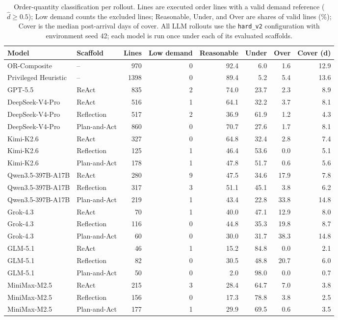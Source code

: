 \begin{table}[t]
\centering
\small
\begin{tabular}{llrrrrrr}
\toprule
Model & Scaffold & Lines & Low demand & Reasonable & Under & Over & Cover (d) \\
\midrule
OR-Composite & -- & 970 & 0 & 92.4 & 6.0 & 1.6 & 12.9 \\
Privileged Heuristic & -- & 1398 & 0 & 89.4 & 5.2 & 5.4 & 13.6 \\
\midrule
GPT-5.5 & ReAct & 835 & 2 & 74.0 & 23.7 & 2.3 & 8.9 \\
DeepSeek-V4-Pro & ReAct & 516 & 1 & 64.1 & 32.2 & 3.7 & 8.1 \\
DeepSeek-V4-Pro & Reflection & 517 & 2 & 36.9 & 61.9 & 1.2 & 4.3 \\
DeepSeek-V4-Pro & Plan-and-Act & 860 & 0 & 70.7 & 27.6 & 1.7 & 8.1 \\
Kimi-K2.6 & ReAct & 327 & 0 & 64.8 & 32.4 & 2.8 & 7.4 \\
Kimi-K2.6 & Reflection & 125 & 1 & 46.4 & 53.6 & 0.0 & 5.1 \\
Kimi-K2.6 & Plan-and-Act & 178 & 1 & 47.8 & 51.7 & 0.6 & 5.6 \\
Qwen3.5-397B-A17B & ReAct & 280 & 9 & 47.5 & 34.6 & 17.9 & 7.8 \\
Qwen3.5-397B-A17B & Reflection & 317 & 3 & 51.1 & 45.1 & 3.8 & 6.2 \\
Qwen3.5-397B-A17B & Plan-and-Act & 219 & 1 & 43.4 & 22.8 & 33.8 & 14.8 \\
Grok-4.3 & ReAct & 70 & 1 & 40.0 & 47.1 & 12.9 & 8.0 \\
Grok-4.3 & Reflection & 116 & 0 & 44.8 & 35.3 & 19.8 & 8.7 \\
Grok-4.3 & Plan-and-Act & 60 & 0 & 30.0 & 31.7 & 38.3 & 14.8 \\
GLM-5.1 & ReAct & 46 & 1 & 15.2 & 84.8 & 0.0 & 2.1 \\
GLM-5.1 & Reflection & 82 & 0 & 30.5 & 48.8 & 20.7 & 6.0 \\
GLM-5.1 & Plan-and-Act & 50 & 0 & 2.0 & 98.0 & 0.0 & 0.7 \\
MiniMax-M2.5 & ReAct & 215 & 3 & 28.4 & 64.7 & 7.0 & 3.8 \\
MiniMax-M2.5 & Reflection & 156 & 0 & 17.3 & 78.8 & 3.8 & 2.5 \\
MiniMax-M2.5 & Plan-and-Act & 177 & 1 & 29.9 & 69.5 & 0.6 & 3.5 \\
\bottomrule
\end{tabular}
\caption{Order-quantity classification per rollout. Lines are executed order lines with a valid demand reference ($\hat d\geq 0.5$); Low demand counts the excluded lines; Reasonable, Under, and Over are shares of valid lines (\%); Cover is the median post-arrival days of cover. All LLM rollouts use the \texttt{hard\_v2} configuration with environment seed 42; each model is run once under each of its evaluated scaffolds.}
\label{tab:order_quantity_runs}
\end{table}
